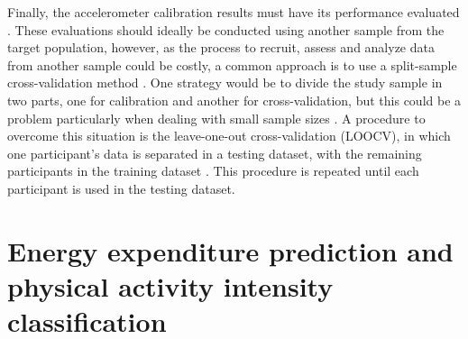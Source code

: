 \documentclass[11pt]{article}
\begin{document}
Finally, the accelerometer calibration results must have its performance evaluated \cite{Basset_2012}. These evaluations should ideally be conducted using another sample from the target population, however, as the process to recruit, assess and analyze data from another sample could be costly, a common approach is to use a split-sample cross-validation method \cite{Staudenmayer_2012}. One strategy would be to divide the study sample in two parts, one for calibration and another for cross-validation, but this could be a problem particularly when dealing with small sample sizes \cite{Staudenmayer_2012}. A procedure to overcome this situation is the leave-one-out cross-validation (LOOCV), in which one participant's data is separated in a testing dataset, with the remaining participants in the training dataset \cite{Staudenmayer_2012}. This procedure is repeated until each participant is used in the testing dataset.

\section*{Energy expenditure prediction and physical activity intensity classification}

\pagebreak



\end{document}
